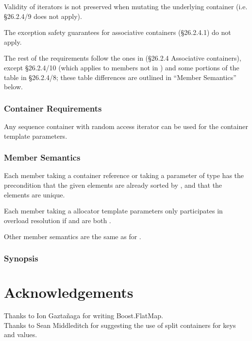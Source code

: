 Validity of iterators is not preserved when mutating the underlying container
(i.e. \S26.2.4/9 does not apply).

The exception safety guarantees for associative containers (\S26.2.4.1) do not
apply.

The rest of the requirements follow the ones in (\S26.2.4 Associative
containers), except \S26.2.4/10 (which applies to members not in
) and some portions of the table in \S26.2.4/8; these table
differences are outlined in ``Member Semantics'' below.

\subsubsection{Container Requirements}

Any sequence container with random access iterator can be used for the
container template parameters.

\subsubsection{Member Semantics}

Each member taking a container reference or taking a parameter of type
 has the precondition that the given
elements are already sorted by , and that the elements are
unique.

Each member taking a allocator template parameters only participates in
overload resolution if  and
 are both .

Other member semantics are the same as for .

\subsubsection{ Synopsis}




\section{Acknowledgements}

Thanks to Ion Gazta\~{n}aga for writing Boost.FlatMap.\\

Thanks to Sean Middleditch for suggesting the use of split containers for keys
and values.
